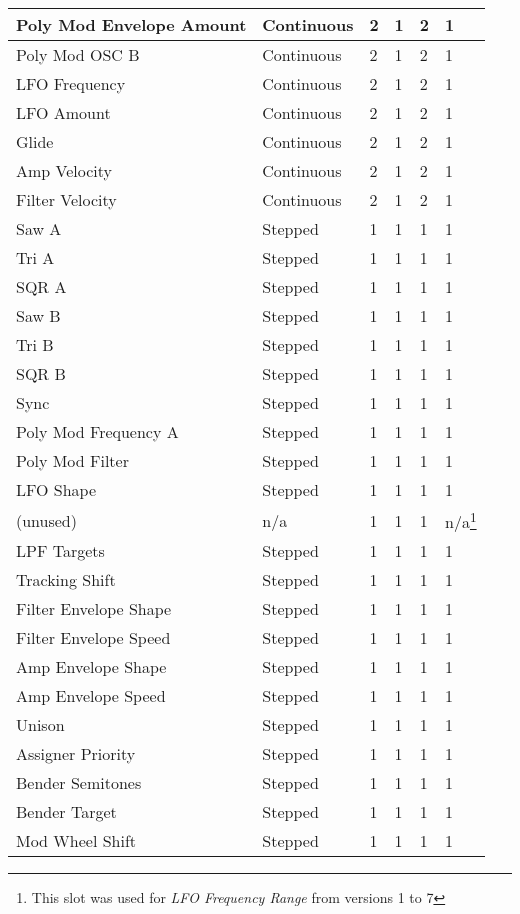 \begin{longtable}[l]{p{5cm}|p{2cm}|p{1.5cm}|p{1.5cm}|p{2cm}|p{2.5cm}}
Poly Mod Envelope Amount & Continuous & 2 & 1 & 2 & 1 \\ \hline
Poly Mod OSC B & Continuous & 2 & 1 & 2 & 1 \\ \hline
LFO Frequency & Continuous & 2 & 1 & 2 & 1 \\ \hline
LFO Amount & Continuous & 2 & 1 & 2 & 1 \\ \hline
Glide & Continuous & 2 & 1 & 2 & 1 \\ \hline
Amp Velocity & Continuous & 2 & 1 & 2 & 1 \\ \hline
Filter Velocity & Continuous & 2 & 1 & 2 & 1 \\ \hline
Saw A & Stepped & 1 & 1 & 1 & 1 \\ \hline
Tri A & Stepped & 1 & 1 & 1 & 1 \\ \hline
SQR A & Stepped & 1 & 1 & 1 & 1 \\ \hline
Saw B & Stepped & 1 & 1 & 1 & 1 \\ \hline
Tri B & Stepped & 1 & 1 & 1 & 1 \\ \hline
SQR B & Stepped & 1 & 1 & 1 & 1 \\ \hline
Sync & Stepped & 1 & 1 & 1 & 1 \\ \hline
Poly Mod Frequency A & Stepped & 1 & 1 & 1 & 1 \\ \hline
Poly Mod Filter & Stepped & 1 & 1 & 1 & 1 \\ \hline
LFO Shape & Stepped & 1 & 1 & 1 & 1 \\ \hline
(unused) & n/a  & 1 & 1 & 1 & n/a\footnote{This slot was used for \textit{LFO Frequency Range} from versions 1 to 7} \\ \hline
LPF Targets & Stepped & 1 & 1 & 1 & 1 \\ \hline
Tracking Shift & Stepped & 1 & 1 & 1 & 1 \\ \hline
Filter Envelope Shape & Stepped & 1 & 1 & 1 & 1 \\ \hline
Filter Envelope Speed & Stepped & 1 & 1 & 1 & 1 \\ \hline
Amp Envelope Shape & Stepped & 1 & 1 & 1 & 1 \\ \hline
Amp Envelope Speed & Stepped & 1 & 1 & 1 & 1 \\ \hline
Unison & Stepped & 1 & 1 & 1 & 1 \\ \hline
Assigner Priority & Stepped & 1 & 1 & 1 & 1 \\ \hline
Bender Semitones & Stepped & 1 & 1 & 1 & 1 \\ \hline
Bender Target & Stepped & 1 & 1 & 1 & 1 \\ \hline
Mod Wheel Shift & Stepped & 1 & 1 & 1 & 1 \\ \hline

\end{longtable}
